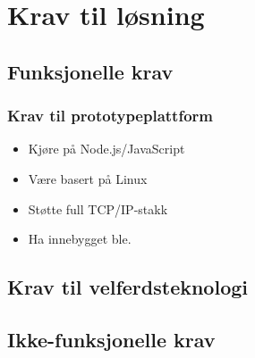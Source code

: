 \chapter{Krav til løsning}
\label{ch:requirements}

\section{Funksjonelle krav}

\subsection{Krav til prototypeplattform}

\begin{itemize}
    \item Kjøre på Node.js/JavaScript
    \item Være basert på Linux
    \item Støtte full TCP/IP-stakk
    \item Ha innebygget \gls{ble}.
\end{itemize}

\section{Krav til velferdsteknologi}

\section{Ikke-funksjonelle krav}

